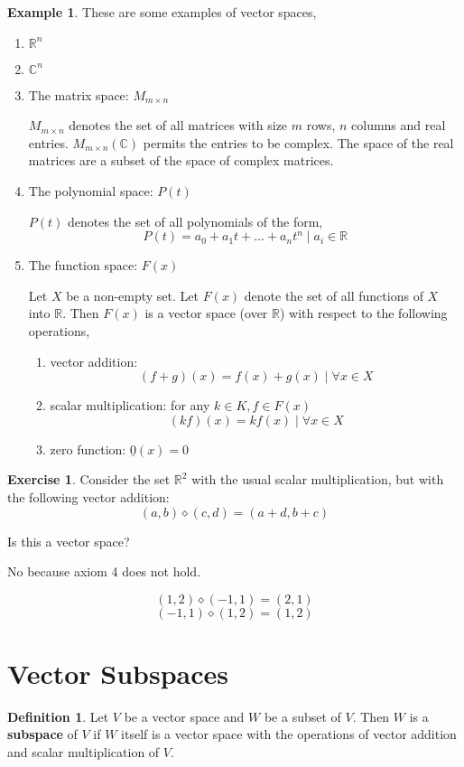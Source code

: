 \documentclass{report}
\theoremstyle{definition}
\newtheorem{_def}{Definition}
\newtheorem{ex}{Example}
\newtheorem{_exc}{Exercise}
\begin{document}
\begin{ex}
These are some examples of vector spaces,
\begin{enumerate}
 \item $\mathbb{R}^n$
 \item $\mathbb{C}^n$
 \item The matrix space: $M_{m\times n}$
 
 $M_{m\times n}$ denotes the set of all matrices with size $m$ rows, $n$ columns and real entries.
 $M_{m\times n}(\mathbb{C})$ permits the entries to be complex.
 The space of the real matrices are a subset of the space of complex matrices.
 \item The polynomial space: $P(t)$
 
 $P(t)$ denotes the set of all polynomials of the form,
 \[P(t)=a_0+a_1t+...+a_nt^n \mid a_i\in \mathbb{R}\]
 \item The function space: $F(x)$
 
 Let $X$ be a non-empty set.
 Let $F(x)$ denote the set of all functions of $X$ into $\mathbb{R}$.
 Then $F(x)$ is a vector space (over $\mathbb{R}$) with respect to the following operations,
 \begin{enumerate}[i]
  \item vector addition: 
  \[(f+g)(x)=f(x)+g(x)\mid \forall x\in X\]
  \item scalar multiplication: for any $k\in K, f\in F(x)$
  \[(kf)(x)=kf(x) \mid \forall x\in X\]
  \item zero function: $\underline{0}(x)=0$ 
 \end{enumerate}
\end{enumerate}
\end{ex}

\begin{_exc}
Consider the set $\mathbb{R}^2$ with the usual scalar multiplication, but with the following vector addition:
\[(a,b)\diamond (c,d)=(a+d,b+c)\]

Is this a vector space?

No because axiom 4 does not hold.

\[(1,2)\diamond (-1,1)=(2,1)\]
\[(-1,1)\diamond (1,2)=(1,2)\]
\end{_exc}

\section{Vector Subspaces}

\begin{_def}
Let $V$ be a vector space and $W$ be a subset of $V$.
Then $W$ is a \textbf{subspace} of $V$ if $W$ itself is a vector space with the operations of vector addition and scalar multiplication of $V$.
\end{_def}
\end{document}
